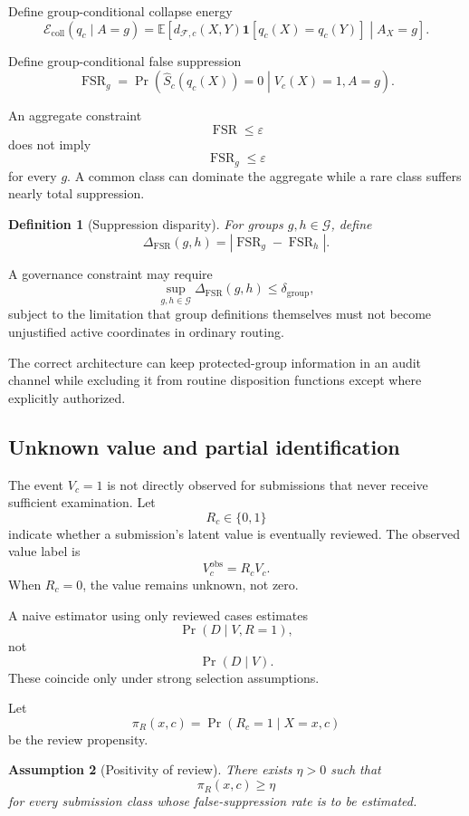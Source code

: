 \documentclass[11pt]{article}
\newtheorem{definition}{Definition}[section]
\newtheorem{assumption}[definition]{Assumption}
\theoremstyle{definition}
\DeclareMathOperator{\Prob}{Pr}
\newcommand{\E}{\mathbb{E}}
\newcommand{\F}{\mathcal{F}}
\newcommand{\ind}{\mathbf{1}}
\newcommand{\eps}{\varepsilon}
\begin{document}
Define group-conditional collapse energy
\[
\mathcal E_{\mathrm{coll}}(q_c\mid A=g)
=
\E
\left[
d_{\F,c}(X,Y)
\ind[q_c(X)=q_c(Y)]
\middle|
A_X=g
\right].
\]

Define group-conditional false suppression
\[
\operatorname{FSR}_g
=
\Prob
\left(
\widehat S_c(q_c(X))=0
\middle|
V_c(X)=1,
A=g
\right).
\]

An aggregate constraint
\[
\operatorname{FSR}\leq\eps
\]
does not imply
\[
\operatorname{FSR}_g\leq\eps
\]
for every \(g\). A common class can dominate the aggregate while a rare class suffers nearly total suppression.

\begin{definition}[Suppression disparity]
For groups \(g,h\in\mathcal G\), define
\[
\Delta_{\mathrm{FSR}}(g,h)
=
\left|
\operatorname{FSR}_g
-
\operatorname{FSR}_h
\right|.
\]
\end{definition}

A governance constraint may require
\[
\sup_{g,h\in\mathcal G}
\Delta_{\mathrm{FSR}}(g,h)
\leq
\delta_{\mathrm{group}},
\]
subject to the limitation that group definitions themselves must not become unjustified active coordinates in ordinary routing.

The correct architecture can keep protected-group information in an audit channel while excluding it from routine disposition functions except where explicitly authorized.

\subsection{Unknown value and partial identification}

The event \(V_c=1\) is not directly observed for submissions that never receive sufficient examination. Let
\[
R_c\in\{0,1\}
\]
indicate whether a submission's latent value is eventually reviewed. The observed value label is
\[
V_c^{\mathrm{obs}}
=
R_cV_c.
\]
When \(R_c=0\), the value remains unknown, not zero.

A naive estimator using only reviewed cases estimates
\[
\Prob(D\mid V,R=1),
\]
not
\[
\Prob(D\mid V).
\]
These coincide only under strong selection assumptions.

Let
\[
\pi_R(x,c)
=
\Prob(R_c=1\mid X=x,c)
\]
be the review propensity.

\begin{assumption}[Positivity of review]
There exists \(\eta>0\) such that
\[
\pi_R(x,c)\geq\eta
\]
for every submission class whose false-suppression rate is to be estimated.
\end{assumption}
\end{document}
